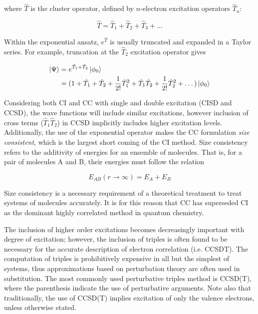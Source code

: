 \noindent where $\hat{T}$ is the cluster operator, defined by $n$-electron excitation operators $\hat{T}_n$:

\begin{equation}
  \hat{T} = \hat{T}_1 + \hat{T}_2 + \hat{T}_3 + \dots
\end{equation}

Within the exponential ansatz, $e^{\hat{T}}$ is usually truncated and expanded in a Taylor series. For example, truncation at the $\hat{T}_2$ excitation operator gives

\begin{equation}
\begin{split}
  \ket{\Psi} &= e^{\hat{T}_1+\hat{T}_2}\ket{\phi_0} \\
  &= (1 + \hat{T}_1 + \hat{T}_2 +  \frac{1}{2!}\hat{T}_1^2 + \hat{T}_1\hat{T}_2 + \frac{1}{2!}\hat{T}_2^2 + \dots)
  \ket{\phi_0}
\end{split}
\end{equation}

\noindent Considering both CI and CC with single and double excitation (CISD and CCSD), the wave functions will include similar excitations, however inclusion of cross terms ($\hat{T}_1\hat{T}_2$) in CCSD implicitly includes higher excitation levels. Additionally, the use of the exponential operator makes the CC formulation \emph{size consistent}, which is the largest short coming of the CI method. Size consistency refers to the additivity of energies for an ensemble of molecules. That is, for a pair of molecules A and B, their energies must follow the relation

\begin{equation}
  E_{AB}(r\rightarrow\infty) = E_A + E_B
\end{equation}

\noindent Size consistency is a necessary requirement of a theoretical treatment to treat systems of molecules accurately. It is for this reason that CC has superseded CI as the dominant highly correlated method in quantum chemistry.

The inclusion of higher order excitations becomes decreasingly important with degree of excitation; however, the inclusion of triples is often found to be necessary for the accurate description of electron correlation (i.e. CCSDT). The computation of triples is prohibitively expensive in all but the simplest of systems, thus approximations based on perturbation theory are often used in substitution. The most commonly used perturbative triples method is CCSD(T), where the parenthesis indicate the use of perturbative arguments. Note also that traditionally, the use of CCSD(T) implies excitation of only the valence electrons, unless otherwise stated.

